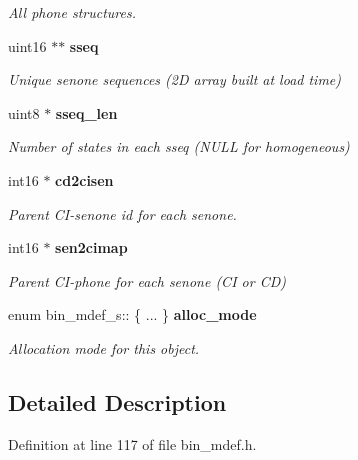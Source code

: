 \begin{DoxyCompactItemize}
\begin{DoxyCompactList}\small\item\em All phone structures. \end{DoxyCompactList}\item 
uint16 $\ast$$\ast$ {\bf sseq}\label{structbin__mdef__s_acb58480658812de7a357dcbd25ad7b41}

\begin{DoxyCompactList}\small\item\em Unique senone sequences (2\-D array built at load time) \end{DoxyCompactList}\item 
uint8 $\ast$ {\bf sseq\-\_\-len}\label{structbin__mdef__s_ab534bbd280015795b8e8ca4e296f4946}

\begin{DoxyCompactList}\small\item\em Number of states in each sseq (N\-U\-L\-L for homogeneous) \end{DoxyCompactList}\item 
int16 $\ast$ {\bf cd2cisen}\label{structbin__mdef__s_ad5e814ffa116c85d46359e3ffd40bff7}

\begin{DoxyCompactList}\small\item\em Parent C\-I-\/senone id for each senone. \end{DoxyCompactList}\item 
int16 $\ast$ {\bf sen2cimap}\label{structbin__mdef__s_a457e5352e52a57de5d1536bcd6b331a9}

\begin{DoxyCompactList}\small\item\em Parent C\-I-\/phone for each senone (C\-I or C\-D) \end{DoxyCompactList}\item 
enum bin\-\_\-mdef\-\_\-s\-:: \{ ... \}  {\bf alloc\-\_\-mode}
\begin{DoxyCompactList}\small\item\em Allocation mode for this object. \end{DoxyCompactList}\end{DoxyCompactItemize}


\subsection{Detailed Description}


Definition at line 117 of file bin\-\_\-mdef.\-h.



